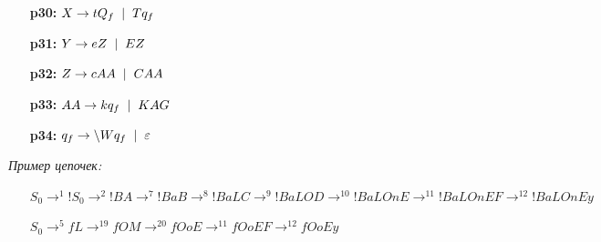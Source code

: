 \documentclass[a4paper,10pt]{article}
\begin{document}
\begin{itemize}
		\item[\textbf{p30:}] $X \to tQ_{f} \hspace{2mm} | \hspace{2mm} Tq_{f}$
		\item[\textbf{p31:}] $Y \to eZ \hspace{2mm} | \hspace{2mm} EZ$
		\item[\textbf{p32:}] $Z \to cAA \hspace{2mm} | \hspace{2mm} CAA$
		\item[\textbf{p33:}] $AA \to kq_{f} \hspace{2mm} | \hspace{2mm} KAG$
		\item[\textbf{p34:}] $q_f \to \backslash Wq_{f} \hspace{2mm} | \hspace{2mm} \varepsilon$
		
	\end{itemize}
	\vspace*{5mm}
	\textit{Пример цепочек:}
	\begin{itemize}
		\item[] $S_0 \rightarrow^{1} !S_0 \rightarrow^{2} !BA \rightarrow^{7} !BaB \rightarrow^{8} !BaLC
		\rightarrow^{9} !BaLOD \rightarrow^{10} !BaLOnE \rightarrow^{11} !BaLOnEF \rightarrow^{12} !BaLOnEy$
		\item[] $S_0 \rightarrow^{5} fL \rightarrow^{19} fOM \rightarrow^{20} fOoE \rightarrow^{11} fOoEF \rightarrow^{12} fOoEy $
	\end{itemize}
	
\end{document}
